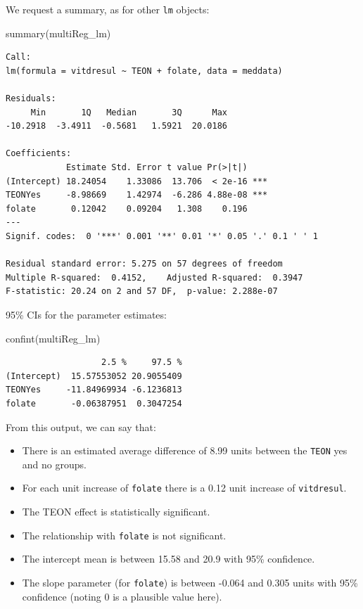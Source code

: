 \documentclass[
  oneside]{krantz}
\newenvironment{Shaded}{\begin{snugshade}}{\end{snugshade}}
\newcommand{\FunctionTok}[1]{\textcolor[rgb]{0.00,0.00,0.00}{#1}}
\newcommand{\NormalTok}[1]{#1}
\providecommand{\tightlist}{%
  \setlength{\itemsep}{0pt}\setlength{\parskip}{0pt}}
\begin{document}
We request a summary, as for other \texttt{lm} objects:

\begin{Shaded}
\begin{Highlighting}[]
\FunctionTok{summary}\NormalTok{(multiReg\_lm)}
\end{Highlighting}
\end{Shaded}

\begin{verbatim}
Call:
lm(formula = vitdresul ~ TEON + folate, data = meddata)

Residuals:
     Min       1Q   Median       3Q      Max 
-10.2918  -3.4911  -0.5681   1.5921  20.0186 

Coefficients:
            Estimate Std. Error t value Pr(>|t|)    
(Intercept) 18.24054    1.33086  13.706  < 2e-16 ***
TEONYes     -8.98669    1.42974  -6.286 4.88e-08 ***
folate       0.12042    0.09204   1.308    0.196    
---
Signif. codes:  0 '***' 0.001 '**' 0.01 '*' 0.05 '.' 0.1 ' ' 1

Residual standard error: 5.275 on 57 degrees of freedom
Multiple R-squared:  0.4152,    Adjusted R-squared:  0.3947 
F-statistic: 20.24 on 2 and 57 DF,  p-value: 2.288e-07
\end{verbatim}

95\% CIs for the parameter estimates:

\begin{Shaded}
\begin{Highlighting}[]
\FunctionTok{confint}\NormalTok{(multiReg\_lm)}
\end{Highlighting}
\end{Shaded}

\begin{verbatim}
                   2.5 %     97.5 %
(Intercept)  15.57553052 20.9055409
TEONYes     -11.84969934 -6.1236813
folate       -0.06387951  0.3047254
\end{verbatim}

From this output, we can say that:

\begin{itemize}
\tightlist
\item
  There is an estimated average difference of 8.99 units between the \texttt{TEON} yes and no groups.
\item
  For each unit increase of \texttt{folate} there is a 0.12 unit increase of \texttt{vitdresul}.
\item
  The TEON effect is statistically significant.
\item
  The relationship with \texttt{folate} is not significant.
\item
  The intercept mean is between 15.58 and 20.9 with 95\% confidence.
\item
  The slope parameter (for \texttt{folate}) is between -0.064 and 0.305 units with 95\% confidence (noting 0 is a plausible value here).
\end{itemize}
\end{document}
